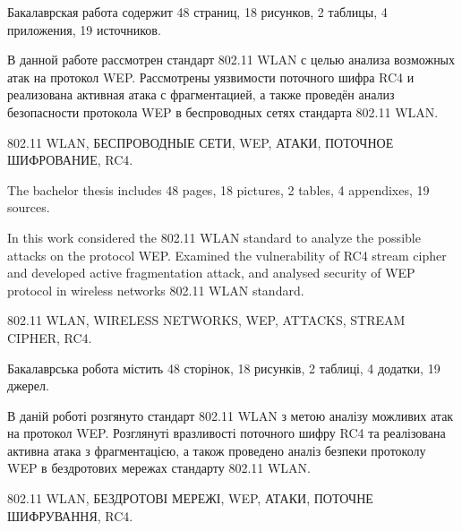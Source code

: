 
Бакалаврская работа содержит 48 страниц, 18 рисунков, 2 таблицы, 4 приложения,
19 источников.

В данной работе рассмотрен стандарт 802.11 WLAN с целью анализа возможных атак
на протокол WEP. Рассмотрены уязвимости поточного шифра RC4 и реализована
активная атака с фрагментацией, а также проведён анализ безопасности протокола
WEP в беспроводных сетях стандарта 802.11 WLAN.

802.11 WLAN, БЕСПРОВОДНЫЕ СЕТИ, WEP, АТАКИ, ПОТОЧНОЕ ШИФРОВАНИЕ, RC4.


The bachelor thesis includes 48 pages, 18 pictures, 2 tables, 4 appendixes, 19
sources.

In this work considered the 802.11 WLAN standard to analyze the possible attacks
on the protocol WEP. Examined the vulnerability of RC4 stream cipher and
developed active fragmentation attack, and analysed security of WEP protocol in
wireless networks 802.11 WLAN standard.

802.11 WLAN, WIRELESS NETWORKS, WEP, ATTACKS, STREAM CIPHER, RC4.


Бакалаврська робота містить 48 сторінок, 18 рисунків, 2 таблиці, 4 додатки, 19
джерел.

В даній роботі розгянуто стандарт 802.11 WLAN з метою аналізу можливих атак на
протокол WEP. Розглянуті вразливості поточного шифру RC4 та реалізована активна
атака з фрагментацією, а також проведено аналіз безпеки протоколу WEP в
бездротових мережах стандарту 802.11 WLAN.

802.11 WLAN, БЕЗДРОТОВІ МЕРЕЖІ, WEP, АТАКИ, ПОТОЧНЕ ШИФРУВАННЯ, RC4.
